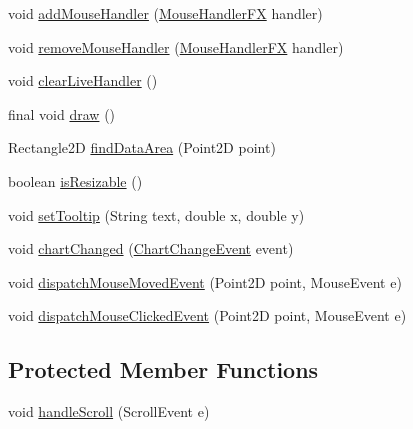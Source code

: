 \begin{DoxyCompactItemize}
\item 
void \mbox{\hyperlink{classorg_1_1jfree_1_1chart_1_1fx_1_1_chart_canvas_a697b7c41214361f43cdb72c046a8169f}{add\+Mouse\+Handler}} (\mbox{\hyperlink{interfaceorg_1_1jfree_1_1chart_1_1fx_1_1interaction_1_1_mouse_handler_f_x}{Mouse\+Handler\+FX}} handler)
\item 
void \mbox{\hyperlink{classorg_1_1jfree_1_1chart_1_1fx_1_1_chart_canvas_a5b3cc71177f4353b1f1a98082e2b0e55}{remove\+Mouse\+Handler}} (\mbox{\hyperlink{interfaceorg_1_1jfree_1_1chart_1_1fx_1_1interaction_1_1_mouse_handler_f_x}{Mouse\+Handler\+FX}} handler)
\item 
void \mbox{\hyperlink{classorg_1_1jfree_1_1chart_1_1fx_1_1_chart_canvas_ac50f68bb98c551b9015c38d3869abf3c}{clear\+Live\+Handler}} ()
\item 
final void \mbox{\hyperlink{classorg_1_1jfree_1_1chart_1_1fx_1_1_chart_canvas_a18e67b7ea52a3eb380f4e3df3e05c85d}{draw}} ()
\item 
Rectangle2D \mbox{\hyperlink{classorg_1_1jfree_1_1chart_1_1fx_1_1_chart_canvas_a95d339b9fbbe98884de917e3194ba9bb}{find\+Data\+Area}} (Point2D point)
\item 
boolean \mbox{\hyperlink{classorg_1_1jfree_1_1chart_1_1fx_1_1_chart_canvas_a30626416cc52caa1ef4fc524a6e8f681}{is\+Resizable}} ()
\item 
void \mbox{\hyperlink{classorg_1_1jfree_1_1chart_1_1fx_1_1_chart_canvas_a5c0315e931ce6d21aa380b890c95c438}{set\+Tooltip}} (String text, double x, double y)
\item 
void \mbox{\hyperlink{classorg_1_1jfree_1_1chart_1_1fx_1_1_chart_canvas_aada7d718977d4674bdf59d0e7c2f03e8}{chart\+Changed}} (\mbox{\hyperlink{classorg_1_1jfree_1_1chart_1_1event_1_1_chart_change_event}{Chart\+Change\+Event}} event)
\item 
void \mbox{\hyperlink{classorg_1_1jfree_1_1chart_1_1fx_1_1_chart_canvas_ae7f2c9177532e59e45195345be362f45}{dispatch\+Mouse\+Moved\+Event}} (Point2D point, Mouse\+Event e)
\item 
void \mbox{\hyperlink{classorg_1_1jfree_1_1chart_1_1fx_1_1_chart_canvas_a6b62f7c2a4a9e8eae104335a46b4c0e7}{dispatch\+Mouse\+Clicked\+Event}} (Point2D point, Mouse\+Event e)
\end{DoxyCompactItemize}
\subsection*{Protected Member Functions}
\begin{DoxyCompactItemize}
\item 
void \mbox{\hyperlink{classorg_1_1jfree_1_1chart_1_1fx_1_1_chart_canvas_ae45402ed4f5a0686ef1139aa4aa805ee}{handle\+Scroll}} (Scroll\+Event e)
\end{DoxyCompactItemize}


